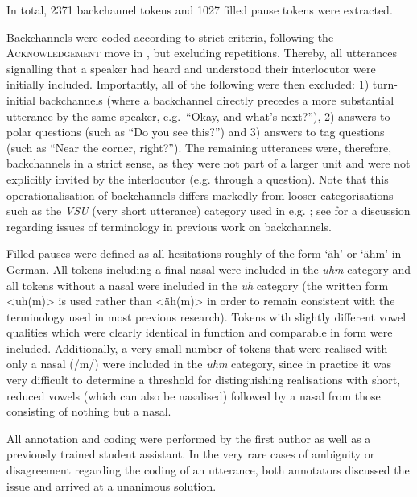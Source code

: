 In total, 2371 backchannel tokens and 1027 filled pause tokens were extracted.

Backchannels were coded according to strict criteria, following the \textsc{Acknowledgement} move in \citet{carlettaReliabilityDialogueStructure1997}, but excluding repetitions. Thereby, all utterances signalling that a speaker had heard and understood their interlocutor were initially included. Importantly, all of the following were then excluded: 1) turn-initial backchannels (where a backchannel directly precedes a more substantial utterance by the same speaker, e.g.~``Okay, and what's next?''), 2) answers to polar questions (such as ``Do you see this?'') and 3) answers to tag questions (such as ``Near the corner, right?''). The remaining utterances were, therefore, backchannels in a strict sense, as they were not part of a larger unit and were not explicitly invited by the interlocutor (e.g. through a question). Note that this operationalisation of backchannels differs markedly from looser categorisations such as the \textit{VSU} (very short utterance) category used in e.g. \citet{heldnerVeryShortUtterances2011,sbrannaUseBackchannelsOther2023}; see \citet{fujimotoListenerResponsesInteraction2009} for a discussion regarding issues of terminology in previous work on backchannels. 

Filled pauses were defined as all hesitations roughly of the form `äh' or `ähm' in German. All tokens including a final nasal were included in the \emph{uhm} category and all tokens without a nasal were included in the \emph{uh} category (the written form \textless uh(m)\textgreater{} is used rather than \textless äh(m)\textgreater{} in order to remain consistent with the terminology used in most previous research). Tokens with slightly different vowel qualities which were clearly identical in function and comparable in form were included. Additionally, a very small number of tokens that were realised with only a nasal (/m/) were included in the \emph{uhm} category, since in practice it was very difficult to determine a threshold for distinguishing realisations with short, reduced vowels (which can also be nasalised) followed by a nasal from those consisting of nothing but a nasal.

 All annotation and coding were performed by the first author as well as a previously trained student assistant. In the very rare cases of ambiguity or disagreement regarding the coding of an utterance, both annotators discussed the issue and arrived at a unanimous solution.


